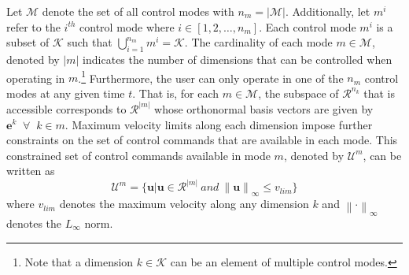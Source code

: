 \documentclass[conference]{IEEEtran}
\newcommand{\norm}[1]{\left\lVert#1\right\rVert}
\begin{document}
 Let $\mathcal{M}$ denote the set of all control modes with $n_m = \vert\mathcal{M}\vert$. Additionally, let $m^i$ refer to the $i^{th}$ control mode where $i \in [1,2,\dots,n_m]$. Each control mode $m^i$ is a subset of $\mathcal{K}$ such that $\bigcup\limits_{i=1}^{n_m} m^i = \mathcal{K}$. The cardinality of each mode $m \in \mathcal{M}$, denoted by $\vert m \vert$ indicates the number of dimensions that can be controlled when operating in $m$.\footnote{Note that a dimension $k \in \mathcal{K}$ can be an element of multiple control modes.} Furthermore, the user can only operate in one of the $n_m$ control modes at any given time $t$. That is, for each $m \in \mathcal{M}$, the subspace of $\mathcal{R}^{n_k}$ that is accessible corresponds to $\mathcal{R}^{\vert m \vert}$ whose orthonormal basis vectors are given by $\boldsymbol{e}^k \;\; \forall \;\; k \in m$. Maximum velocity limits along each dimension impose further constraints on the set of control commands that are available in each mode. This constrained set of control commands available in mode $m$, denoted by $\mathcal{U}^m$, can be written as 
\begin{equation*}
\mathcal{U}^m = \{\boldsymbol{u} | \boldsymbol{u} \in \mathcal{R}^{\vert m \vert} ~ and ~ \norm{\boldsymbol{u}}_{\infty} \leq v_{lim} \} 
\end{equation*}
where $v_{lim}$ denotes the maximum velocity along any dimension $k$ and $\norm{\cdot}_{\infty}$ denotes the $L_\infty$ norm. 
\end{document}
